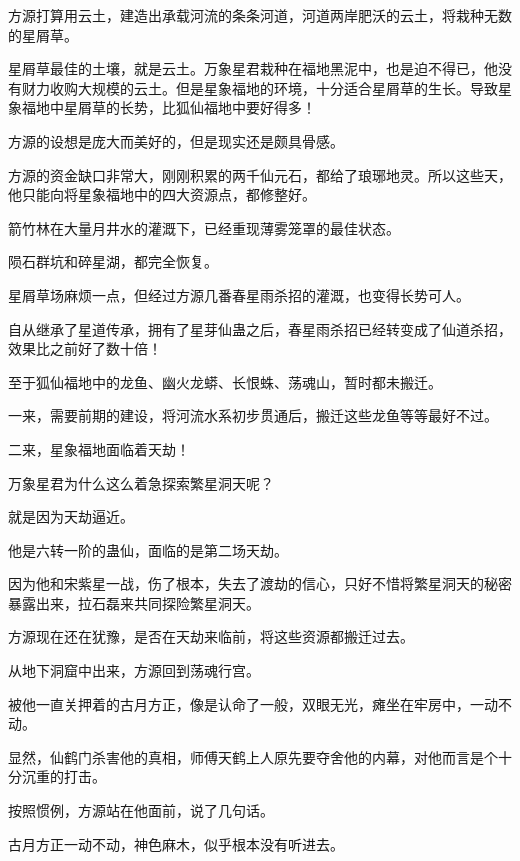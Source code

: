 \begin{this_body}
方源打算用云土，建造出承载河流的条条河道，河道两岸肥沃的云土，将栽种无数的星屑草。

星屑草最佳的土壤，就是云土。万象星君栽种在福地黑泥中，也是迫不得已，他没有财力收购大规模的云土。但是星象福地的环境，十分适合星屑草的生长。导致星象福地中星屑草的长势，比狐仙福地中要好得多！

方源的设想是庞大而美好的，但是现实还是颇具骨感。

方源的资金缺口非常大，刚刚积累的两千仙元石，都给了琅琊地灵。所以这些天，他只能向将星象福地中的四大资源点，都修整好。

箭竹林在大量月井水的灌溉下，已经重现薄雾笼罩的最佳状态。

陨石群坑和碎星湖，都完全恢复。

星屑草场麻烦一点，但经过方源几番春星雨杀招的灌溉，也变得长势可人。

自从继承了星道传承，拥有了星芽仙蛊之后，春星雨杀招已经转变成了仙道杀招，效果比之前好了数十倍！

至于狐仙福地中的龙鱼、幽火龙蟒、长恨蛛、荡魂山，暂时都未搬迁。

一来，需要前期的建设，将河流水系初步贯通后，搬迁这些龙鱼等等最好不过。

二来，星象福地面临着天劫！

万象星君为什么这么着急探索繁星洞天呢？

就是因为天劫逼近。

他是六转一阶的蛊仙，面临的是第二场天劫。

因为他和宋紫星一战，伤了根本，失去了渡劫的信心，只好不惜将繁星洞天的秘密暴露出来，拉石磊来共同探险繁星洞天。

方源现在还在犹豫，是否在天劫来临前，将这些资源都搬迁过去。

从地下洞窟中出来，方源回到荡魂行宫。

被他一直关押着的古月方正，像是认命了一般，双眼无光，瘫坐在牢房中，一动不动。

显然，仙鹤门杀害他的真相，师傅天鹤上人原先要夺舍他的内幕，对他而言是个十分沉重的打击。

按照惯例，方源站在他面前，说了几句话。

古月方正一动不动，神色麻木，似乎根本没有听进去。

\end{this_body}


